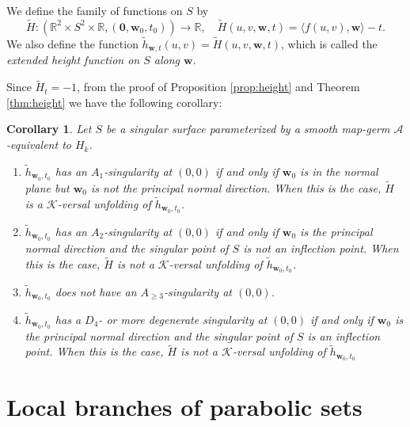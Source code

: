 \documentclass[12pt]{amsart}
\theoremstyle{plain}
\newtheorem{corollary}[theorem]{Corollary}
\theoremstyle{definition}
\newcommand{\R}{\mathbb{R}}
\renewcommand{\geq}{\geqslant}
\begin{document}
We define the family of functions on $S$ by
$$
\tilde{H}\colon (\R^2 \times S^2 \times \R, (\bm{0},\bm{w}_0,t_0)) \to \R, \quad \tilde{H}(u,v,\bm{w},t)=\langle f(u,v),\bm{w}\rangle - t.
$$
We also define the function $\tilde{h}_{\bm{w},t}(u,v)=\tilde{H}(u,v,\bm{w},t)$, which is called the \emph{extended height function on $S$ along $\bm{w}$}. 

Since $\tilde{H}_t = -1$, from the proof of Proposition \ref{prop:height} and Theorem \ref{thm:height} we have the following corollary:

\begin{corollary}
\label{thm:col}
Let $S$ be a singular surface parameterized by a smooth map-germ $\mathcal{A}$-equivalent to $H_k$.
\begin{enumerate}
\item 
$\tilde{h}_{\bm{w}_0,t_0}$ has an $A_1$-singularity at $(0,0)$ if and only if $\bm{w}_0$ is in the normal plane but $\bm{w}_0$ is not the principal normal direction. 
When this is the case, $\tilde{H}$ is a $\mathcal{K}$-versal unfolding of $\tilde{h}_{\bm{w}_0,t_0}$. 

\item 
$\tilde{h}_{\bm{w}_0,t_0}$ has an $A_2$-singularity at $(0,0)$ if and only if $\bm{w}_0$ is the principal normal direction and the singular point of $S$ is not an inflection point. 
When this is the case, $\tilde{H}$ is not a $\mathcal{K}$-versal unfolding of $\tilde{h}_{\bm{w}_0,t_0}$. 

\item 
$\tilde{h}_{\bm{w}_0,t_0}$ does not have an $A_{\geq 3}$-singularity at $(0,0)$.

\item 
$\tilde{h}_{\bm{w}_0,t_0}$ has a $D_4$- or more degenerate singularity at $(0,0)$ if and only if $\bm{w}_0$ is the principal normal direction and the singular point of $S$ is an inflection point. 
When this is the case, $\tilde{H}$ is not a $\mathcal{K}$-versal unfolding of $\tilde{h}_{\bm{w}_0,t_0}$
\end{enumerate}
\end{corollary}

\section{Local branches of parabolic sets}
\end{document}
